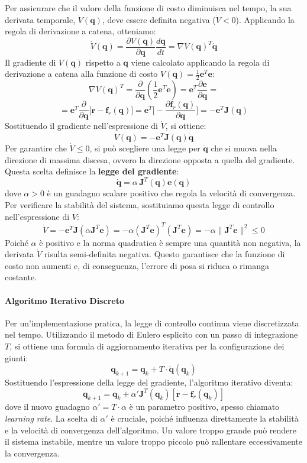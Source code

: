 \documentclass[11pt, a4paper]{report}
\begin{document}
Per assicurare che il valore della funzione di costo diminuisca nel tempo, la sua derivata temporale, \(\dot{V}(\bm{q})\), deve essere definita negativa (\(\dot{V} < 0\)). Applicando la regola di derivazione a catena, otteniamo:
\[
    \dot{V}(\bm{q}) = \frac{\partial V(\bm{q})}{\partial \bm{q}} \frac{d\bm{q}}{dt} = \nabla V(\bm{q})^T \dot{\bm{q}}
\]
Il gradiente di \(V(\bm{q})\) rispetto a \(\bm{q}\) viene calcolato applicando la regola di derivazione a catena alla funzione di costo \(V(\bm{q}) = \frac{1}{2} \bm{e}^T \bm{e}\):
\[
    \nabla V(\bm{q})^T = \frac{\partial}{\partial \bm{q}} \left( \frac{1}{2} \bm{e}^T \bm{e} \right) = \bm{e}^T \frac{\partial \bm{e}}{\partial \bm{q}} =
\]
\[
    = \bm{e}^T\frac{\partial}{\partial \bm{q}} \biggl[\bm{r} - \bm{f}_r(\bm{q}) \biggr] = \bm{e}^T \biggl[- \frac{\partial \bm{f}_r(\bm{q})}{\partial \bm{q}} \biggr] = - \bm{e}^T \bm{J}(\bm{q})
\]
Sostituendo il gradiente nell'espressione di \(\dot{V}\), si ottiene:
\[
    \dot{V}(\bm{q}) = - \bm{e}^T \bm{J}(\bm{q}) \dot{\bm{q}}
\]
Per garantire che \(\dot{V} \le 0\), si può scegliere una legge per \(\dot{\bm{q}}\) che si muova nella direzione di massima discesa, ovvero la direzione opposta a quella del gradiente. Questa scelta definisce la \textbf{legge del gradiente}:
\[
    \dot{\bm{q}} = \alpha \, \bm{J}^T(\bm{q}) \bm{e}(\bm{q})
\]
dove \(\alpha > 0\) è un guadagno scalare positivo che regola la velocità di convergenza. Per verificare la stabilità del sistema, sostituiamo questa legge di controllo nell'espressione di \(\dot{V}\):
\[
    \dot{V} = - \bm{e}^T \bm{J} (\alpha \bm{J}^T \bm{e}) = - \alpha (\bm{J}^T \bm{e})^T (\bm{J}^T \bm{e}) = - \alpha \| \bm{J}^T \bm{e} \|^2 \leq 0
\]
Poiché \(\alpha\) è positivo e la norma quadratica è sempre una quantità non negativa, la derivata \(\dot{V}\) risulta semi-definita negativa. Questo garantisce che la funzione di costo non aumenti e, di conseguenza, l'errore di posa si riduca o rimanga costante.

\paragraph{Algoritmo Iterativo Discreto}
Per un'implementazione pratica, la legge di controllo continua viene discretizzata nel tempo. Utilizzando il metodo di Eulero esplicito con un passo di integrazione \(T\), si ottiene una formula di aggiornamento iterativa per la configurazione dei giunti:
\[
    \bm{q}_{k+1} = \bm{q}_k + T \cdot \dot{\bm{q}}(\bm{q}_k)
\]
Sostituendo l'espressione della legge del gradiente, l'algoritmo iterativo diventa:
\[
    \bm{q}_{k+1} = \bm{q}_k + \alpha' \bm{J}^T(\bm{q}_k) \left[ \bm{r} - \bm{f}_r(\bm{q}_k) \right]
\]
dove il nuovo guadagno \(\alpha' = T \cdot \alpha\) è un parametro positivo, spesso chiamato \textit{learning rate}. La scelta di \(\alpha'\) è cruciale, poiché influenza direttamente la stabilità e la velocità di convergenza dell'algoritmo. Un valore troppo grande può rendere il sistema instabile, mentre un valore troppo piccolo può rallentare eccessivamente la convergenza.
\end{document}
